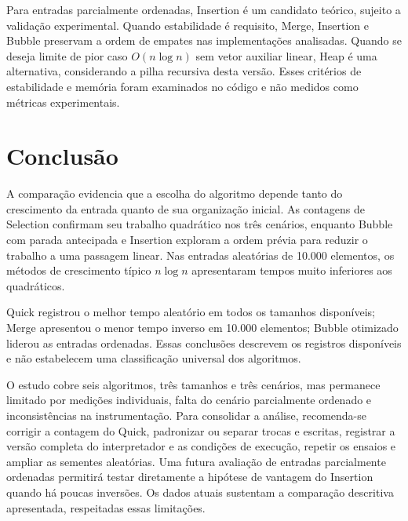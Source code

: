 \documentclass[12pt]{uftex}
\begin{document}
Para entradas parcialmente ordenadas, Insertion é um candidato teórico, sujeito a validação experimental. Quando estabilidade é requisito, Merge, Insertion e Bubble preservam a ordem de empates nas implementações analisadas. Quando se deseja limite de pior caso $O(n\log n)$ sem vetor auxiliar linear, Heap é uma alternativa, considerando a pilha recursiva desta versão. Esses critérios de estabilidade e memória foram examinados no código e não medidos como métricas experimentais.

\chapter{Conclusão}
A comparação evidencia que a escolha do algoritmo depende tanto do crescimento da entrada quanto de sua organização inicial. As contagens de Selection confirmam seu trabalho quadrático nos três cenários, enquanto Bubble com parada antecipada e Insertion exploram a ordem prévia para reduzir o trabalho a uma passagem linear. Nas entradas aleatórias de 10.000 elementos, os métodos de crescimento típico $n\log n$ apresentaram tempos muito inferiores aos quadráticos.

Quick registrou o melhor tempo aleatório em todos os tamanhos disponíveis; Merge apresentou o menor tempo inverso em 10.000 elementos; Bubble otimizado liderou as entradas ordenadas. Essas conclusões descrevem os registros disponíveis e não estabelecem uma classificação universal dos algoritmos.

O estudo cobre seis algoritmos, três tamanhos e três cenários, mas permanece limitado por medições individuais, falta do cenário parcialmente ordenado e inconsistências na instrumentação. Para consolidar a análise, recomenda-se corrigir a contagem do Quick, padronizar ou separar trocas e escritas, registrar a versão completa do interpretador e as condições de execução, repetir os ensaios e ampliar as sementes aleatórias. Uma futura avaliação de entradas parcialmente ordenadas permitirá testar diretamente a hipótese de vantagem do Insertion quando há poucas inversões. Os dados atuais sustentam a comparação descritiva apresentada, respeitadas essas limitações.
\end{document}
